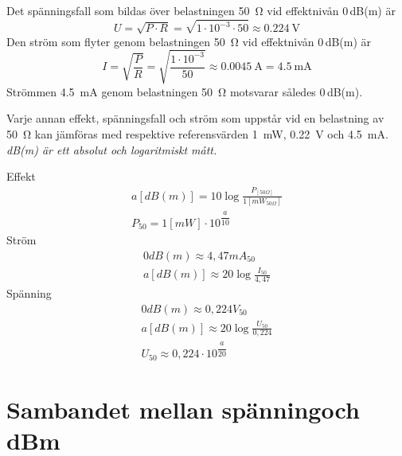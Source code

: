 Det spänningsfall som bildas över belastningen \SI{50}{\ohm} vid effektnivån
0\,dB(m) är
\[U = \sqrt{P\cdot R} = \sqrt{1\cdot 10^{-3} \cdot 50} \approx \SI{0,224}{\volt}\]
Den ström som flyter genom belastningen \SI{50}{\ohm} vid effektnivån 0\,dB(m)
är
\[
I = \sqrt{\frac{P}{R}} = \sqrt{\frac{1\cdot 10^{-3}}{50}} \approx \SI{0,0045}{\ampere} = \SI{4,5}{\milli\ampere}
\]
Strömmen \SI{4,5}{\milli\ampere} genom belastningen \SI{50}{\ohm} motsvarar
således 0\,dB(m).

Varje annan effekt, spänningsfall och ström som uppstår vid en belastning av
\SI{50}{\ohm} kan jämföras med respektive referensvärden \SI{1}{\milli\watt},
\SI{0,22}{\volt} och \SI{4,5}{\milli\ampere}.
\emph{dB(m) är ett absolut och logaritmiskt mått.}

\vspace*{1ex}
\noindent
Effekt
\begin{gather*}
	a [dB(m)] = 10 \log\frac{P_{[50 \Omega]}}{1[mW_{50 \Omega}]} \\
	P_{50} = 1 [mW] \cdot 10^{\dfrac{a}{10}}
\end{gather*}
Ström
\begin{gather*}
	0 dB(m) \approx 4,47 mA_{50} \\
	a [dB(m)] \approx 20 \log\frac{I_{50}}{4,47}
\end{gather*}
Spänning
\begin{gather*}
	0 dB(m) \approx 0,224 V_{50} \\
	a [dB(m)] \approx 20 \log\frac{U_{50}}{0,224} \\
	U_{50} \approx 0,224 \cdot 10^{\dfrac{a}{20}}
\end{gather*}

\section[Sambandet spänning och dBm]{Sambandet mellan spänning\newline och dBm}

